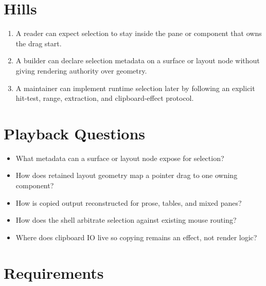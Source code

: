 \section{Hills}\label{record-127-hills}

\begin{enumerate}
\def\labelenumi{\arabic{enumi}.}
\tightlist
\item
  A reader can expect selection to stay inside the pane or component that owns the drag start.
\item
  A builder can declare selection metadata on a surface or layout node without giving rendering authority over geometry.
\item
  A maintainer can implement runtime selection later by following an explicit hit-test, range, extraction, and clipboard-effect protocol.
\end{enumerate}

\section{Playback Questions}\label{record-127-playback-questions}

\begin{itemize}
\tightlist
\item
  What metadata can a surface or layout node expose for selection?
\item
  How does retained layout geometry map a pointer drag to one owning component?
\item
  How is copied output reconstructed for prose, tables, and mixed panes?
\item
  How does the shell arbitrate selection against existing mouse routing?
\item
  Where does clipboard IO live so copying remains an effect, not render logic?
\end{itemize}

\section{Requirements}\label{record-127-requirements}

